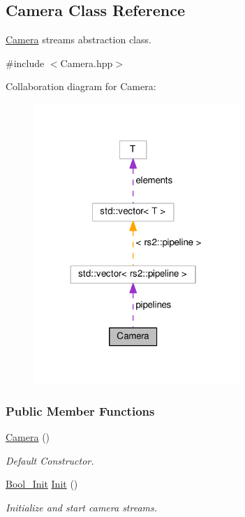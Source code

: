 \hypertarget{classCamera}{}\subsection{Camera Class Reference}
\label{classCamera}


\hyperlink{classCamera}{Camera} streams abstraction class.  




{\ttfamily \#include $<$Camera.\+hpp$>$}



Collaboration diagram for Camera\+:\nopagebreak
\begin{figure}[H]
\begin{center}
\leavevmode
\includegraphics[width=221pt]{classCamera__coll__graph}
\end{center}
\end{figure}
\subsubsection*{Public Member Functions}
\begin{DoxyCompactItemize}
\item 
\hyperlink{classCamera_a01f94c3543f56ede7af49dc778f19331}{Camera} ()
\begin{DoxyCompactList}\small\item\em Default Constructor. \end{DoxyCompactList}\item 
\hyperlink{structBool__Init}{Bool\+\_\+\+Init} \hyperlink{classCamera_a7f09b843d9b3a97e78eefcebbc53e054}{Init} ()
\begin{DoxyCompactList}\small\item\em Initialize and start camera streams. \end{DoxyCompactList}\end{DoxyCompactItemize}

